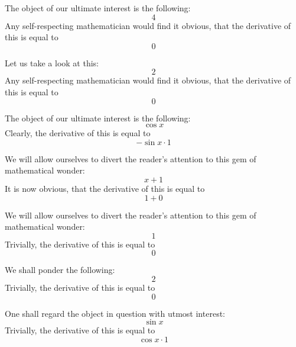 \documentclass{article}
\begin{document}
The object of our ultimate interest is the following:
\begin{equation}
4 
\end{equation}
Any self-respecting mathematician would find it obvious, that the derivative of this is equal to
\begin{equation}
0 
\end{equation}

Let us take a look at this:
\begin{equation}
2 
\end{equation}
Any self-respecting mathematician would find it obvious, that the derivative of this is equal to
\begin{equation}
0 
\end{equation}

The object of our ultimate interest is the following:
\begin{equation}
\cos x 
\end{equation}
Clearly, the derivative of this is equal to
\begin{equation}
-\sin x \cdot 1 
\end{equation}

We will allow ourselves to divert the reader's attention to this gem of mathematical wonder:
\begin{equation}
x + 1 
\end{equation}
It is now obvious, that the derivative of this is equal to
\begin{equation}
1 + 0 
\end{equation}

We will allow ourselves to divert the reader's attention to this gem of mathematical wonder:
\begin{equation}
1 
\end{equation}
Trivially, the derivative of this is equal to
\begin{equation}
0 
\end{equation}

We shall ponder the following:
\begin{equation}
2 
\end{equation}
Trivially, the derivative of this is equal to
\begin{equation}
0 
\end{equation}

One shall regard the object in question with utmost interest:
\begin{equation}
\sin x 
\end{equation}
Trivially, the derivative of this is equal to
\begin{equation}
\cos x \cdot 1 
\end{equation}
\end{document}
